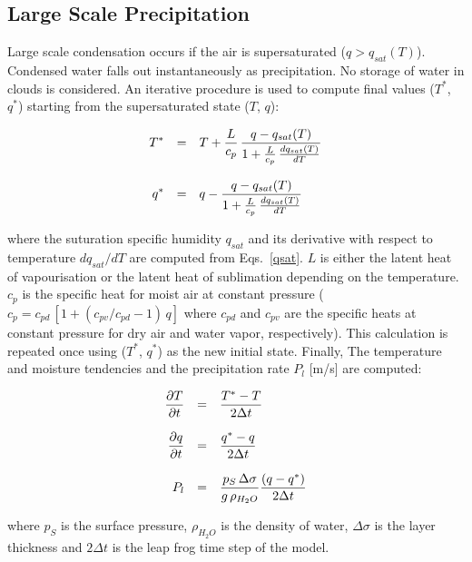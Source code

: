\subsection{Large Scale Precipitation}

Large scale condensation occurs if the air is
supersaturated ($q > q_{sat}(T)$). Condensed water
falls out
instantaneously as precipitation. No storage of water
in clouds is considered. An iterative procedure is used
to compute final
values ($T^*$, $q^*$) starting from the
supersaturated state  ($T$, $q$):

\begin{equation}\label{lsp1}
\begin{array}{rcl}
\displaystyle T^* & = & \displaystyle T + \frac{L}{c_p} \, \frac{q -
q_{sat}
(T)}{1+\frac{L}{c_p}\, \frac{dq_{sat}(T)}{dT}} \\
&&\\
\displaystyle q^* & = & \displaystyle q -\frac{q -
q_{sat}(T)}{1+\frac{L}{c_p}\,
\frac{dq_{sat}(T)}{dT}} 
\end{array}
\end{equation}

where the suturation specific humidity $q_{sat}$  and
its derivative with respect to temperature 
$dq_{sat}/dT$ are computed from Eqs.~\ref{qsat}.
$L$ is
either the latent heat of vapourisation or
the latent heat of  sublimation depending on the
temperature.
$c_p$ is the specific
heat for moist air at constant pressure ($c_p= c_{pd} \,
[1+(c_{pv}/c_{pd}-1)\, q]$ where
$c_{pd}$ and $c_{pv}$ are the specific heats at
constant pressure for dry air and water vapor,
respectively). This calculation is repeated once using
($T^*$,
$q^*$) as the new initial state. Finally, The
temperature
and moisture tendencies and the precipitation rate
$P_{l}$  [m/s] are computed:

\begin{equation}
\begin{array}{rcl}
\displaystyle \frac{\partial T}{\partial t} & = &
\displaystyle \frac{T^*-T}{2\Delta t} \\
&&\\ 
\displaystyle \frac{\partial q}{\partial t} & = &
\displaystyle \frac{q^*-q}{2\Delta  t} \\
&& \\
\displaystyle P_{l} & =  & \displaystyle  \frac{p_S \, \Delta \sigma}{g \,
{\rho}_{H_2O}} \frac{ (q-q^*)}{2\Delta t}
\end{array}
\end{equation}

where $p_S$ is the surface pressure, $\rho_{H_2O}$
is
the density of water, $\Delta \sigma$ is the layer
thickness and $2\Delta t$ is the leap frog time step of
the model.

